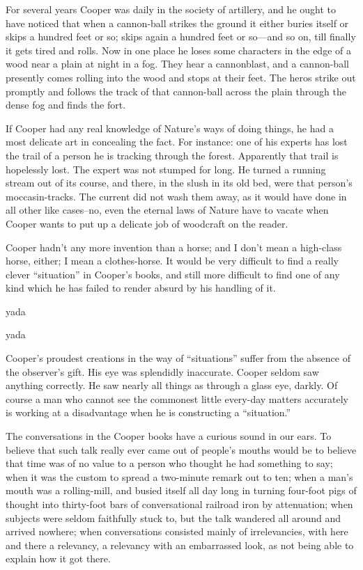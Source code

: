 \documentclass[../interior-demo.tex]{subfiles}
\begin{document}
For several years Cooper was daily in the society of artillery,
and he ought to have noticed that when a cannon-ball strikes the ground it
either buries itself or skips a hundred feet or so; skips again a hundred feet
or so---and so on, till finally it gets tired and rolls. Now in one place
he loses some characters in the edge of a wood
near a plain at night in a fog. They hear a cannonblast, and a
cannon-ball presently comes rolling into the wood and stops at their
feet. The heros strike out promptly and follows the track of that cannon-ball
across the plain through the dense fog and finds the fort.

If Cooper had any real knowledge of Nature's ways of doing
things, he had a most delicate art in concealing the fact. For instance:
one of his experts has lost the trail of a person he is tracking through the
forest. Apparently that trail is hopelessly lost. The expert was not stumped
for long. He turned a running
stream out of its course, and there, in the slush in its old bed, were
that person's moccasin-tracks. The current did not wash them away, as
it would have done in all other like cases--no, even the eternal laws
of Nature have to vacate when Cooper wants to put up a delicate job of
woodcraft on the reader.

Cooper hadn't any more invention than a horse; and I don't mean a
high-class horse, either; I mean a clothes-horse. It would be very
difficult to find a really clever ``situation'' in Cooper's books, and
still more difficult to find one of any kind which he has failed to
render absurd by his handling of it.

yada

yada




Cooper's proudest creations in the way of ``situations'' suffer
from the absence of the observer's gift. His eye was
splendidly inaccurate. Cooper seldom saw anything correctly. He saw
nearly all things as through a glass eye, darkly. Of course a man who
cannot see the commonest little every-day matters accurately is
working at a disadvantage when he is constructing a ``situation.''

The conversations in the Cooper books have a curious sound in our
ears. To believe that such talk really ever came out of people's mouths
would be to believe that time was of no value to
a person who thought he had something to say; when it was the custom
to spread a two-minute remark out to ten; when a man's mouth was a
rolling-mill, and busied itself all day long in turning four-foot pigs
of thought into thirty-foot bars of conversational railroad iron by
attenuation; when subjects were seldom faithfully stuck to, but the talk
wandered all around and arrived nowhere; when conversations consisted
mainly of irrelevancies, with here and there a relevancy, a relevancy
with an embarrassed look, as not being able to explain how it got there.
\end{document}

